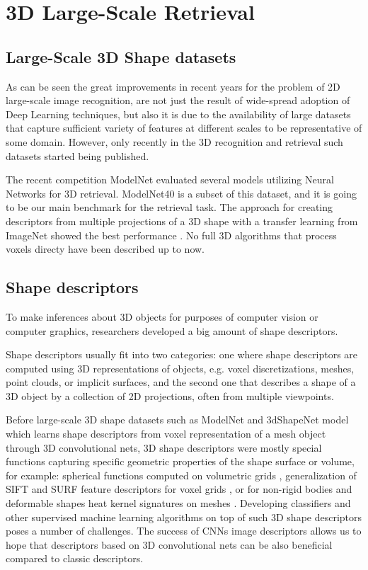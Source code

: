 \section{3D Large-Scale Retrieval}
\label{sec:2}
\subsection{Large-Scale 3D Shape datasets}

As can be seen the great improvements in recent years for the problem of 2D large-scale image recognition, are not just the result of wide-spread adoption of Deep Learning techniques, but also it is due to the availability of large datasets that capture sufficient variety of features at different scales to be representative of some domain.
However, only recently in the 3D recognition and retrieval such datasets started being published.

The recent competition ModelNet evaluated several models utilizing Neural Networks for 3D retrieval. ModelNet40 is a subset of this dataset, and it is going to be our main benchmark for the retrieval task.
The approach for creating descriptors from multiple projections of a 3D shape with a transfer learning from ImageNet showed the best performance \cite{su15mvcnn}. No full 3D algorithms that process voxels directy have been described up to now.

\subsection{Shape descriptors}

To make inferences about 3D objects for purposes of computer vision or computer graphics, researchers developed a big amount of shape descriptors\cite{kazhdan2003rotation,knopp2010hough,bronstein2011shape,kokkinos2012intrinsic}.

Shape descriptors usually fit into two categories: one where shape descriptors are computed using 3D representations of objects, e.g. voxel discretizations, meshes, point clouds, or implicit surfaces, and the second one that describes a shape of a 3D object by a collection of 2D projections, often from multiple viewpoints.

Before large-scale 3D shape datasets such as ModelNet \cite{wu20153d} and 3dShapeNet model which learns shape descriptors from voxel representation of a mesh object through 3D convolutional nets, 3D shape descriptors were mostly special functions capturing specific geometric properties of the shape surface or volume, for example: spherical functions computed on volumetric grids \cite{kazhdan2003rotation}, generalization of SIFT and SURF feature descriptors for voxel grids \cite{knopp2010hough}, or for non-rigid bodies and deformable shapes heat kernel signatures on meshes \cite{bronstein2011shape,kokkinos2012intrinsic}. Developing classifiers and other supervised machine learning algorithms on top of such 3D shape descriptors poses a number of challenges. The success of CNNs image descriptors allows us to hope that descriptors based on 3D convolutional nets can be also beneficial compared to classic descriptors.

